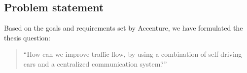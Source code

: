 \subsection{Problem statement}
Based on the goals and requirements set by Accenture, we have formulated the thesis question:
\begin{quote}
	``How can we improve traffic flow, by using a combination of self-driving cars and a centralized communication system?''
\end{quote}
